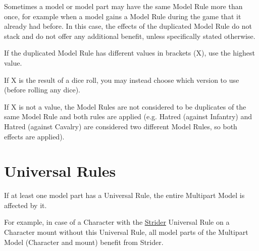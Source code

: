 Sometimes a model or model part may have the same Model Rule more than once, for example when a model gains a Model Rule during the game that it already had before. In this case, the effects of the duplicated Model Rule do not stack and do not offer any additional benefit, unless specifically stated otherwise.

If the duplicated Model Rule has different values in brackets (X), use the highest value.

If X is the result of a dice roll, you may instead choose which version to use (before rolling any dice).

If X is not a value, the Model Rules are not considered to be duplicates of the same Model Rule and both rules are applied (e.g. Hatred (against Infantry) and Hatred (against Cavalry) are considered two different Model Rules, so both effects are applied).

\section{Universal Rules}
\idx[main=y]{\universalrules}\label{universal_rules}

If at least one model part has a Universal Rule, the entire Multipart Model is affected by it.

For example, in case of a Character with the \hyperref[strider]{Strider} Universal Rule on a Character mount without this Universal Rule, all model parts of the Multipart Model (Character and mount) benefit from Strider.

